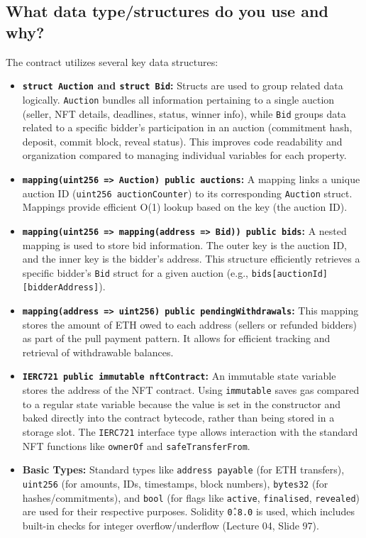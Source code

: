 \documentclass[11pt, a4paper]{article}
\begin{document}
\subsection{What data type/structures do you use and why?}
The contract utilizes several key data structures:
\begin{itemize}
    \item \textbf{\texttt{struct Auction} and \texttt{struct Bid}:} Structs are used to group related data logically. \texttt{Auction} bundles all information pertaining to a single auction (seller, NFT details, deadlines, status, winner info), while \texttt{Bid} groups data related to a specific bidder's participation in an auction (commitment hash, deposit, commit block, reveal status). This improves code readability and organization compared to managing individual variables for each property.
    \item \textbf{\texttt{mapping(uint256 => Auction) public auctions}:} A mapping links a unique auction ID (\texttt{uint256 auctionCounter}) to its corresponding \texttt{Auction} struct. Mappings provide efficient O(1) lookup based on the key (the auction ID).
    \item \textbf{\texttt{mapping(uint256 => mapping(address => Bid)) public bids}:} A nested mapping is used to store bid information. The outer key is the auction ID, and the inner key is the bidder's address. This structure efficiently retrieves a specific bidder's \texttt{Bid} struct for a given auction (e.g., \texttt{bids[auctionId][bidderAddress]}).
    \item \textbf{\texttt{mapping(address => uint256) public pendingWithdrawals}:} This mapping stores the amount of ETH owed to each address (sellers or refunded bidders) as part of the pull payment pattern. It allows for efficient tracking and retrieval of withdrawable balances.
    \item \textbf{\texttt{IERC721 public immutable nftContract}:} An immutable state variable stores the address of the NFT contract. Using \texttt{immutable} saves gas compared to a regular state variable because the value is set in the constructor and baked directly into the contract bytecode, rather than being stored in a storage slot. The \texttt{IERC721} interface type allows interaction with the standard NFT functions like \texttt{ownerOf} and \texttt{safeTransferFrom}.
    \item \textbf{Basic Types:} Standard types like \texttt{address payable} (for ETH transfers), \texttt{uint256} (for amounts, IDs, timestamps, block numbers), \texttt{bytes32} (for hashes/commitments), and \texttt{bool} (for flags like \texttt{active}, \texttt{finalised}, \texttt{revealed}) are used for their respective purposes. Solidity \texttt{\^0.8.0} is used, which includes built-in checks for integer overflow/underflow (Lecture 04, Slide 97).
\end{itemize}
\end{document}
